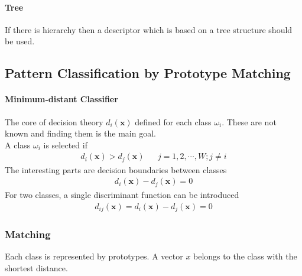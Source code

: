 \paragraph{Tree}
If there is hierarchy then a descriptor which is based on a tree structure
should be used.

\subsection{Pattern Classification by Prototype Matching}
\paragraph{Minimum-distant Classifier}
The core of decision theory $d_i(\mathbf{x})$ defined for each class $\omega_i$.
These are not known and finding them is the main goal. \\

A class $\omega_i$ is selected if
\begin{align*}
d_i(\mathbf{x}) > d_j(\mathbf{x}) && j=1,2, \cdots, W; j \neq i
\end{align*}
The interesting parts are decision boundaries between classes
\begin{align*}
	d_i(\mathbf{x}) - d_j(\mathbf{x}) = 0
\end{align*}
For two classes, a single discriminant function can be introduced
\begin{align*}
	d_{ij}(\mathbf{x}) = d_i(\mathbf{x}) - d_j(\mathbf{x}) = 0
\end{align*}

\subsubsection{Matching}
Each class is represented by prototypes.
A vector $x$ belongs to the class with the shortest distance.


